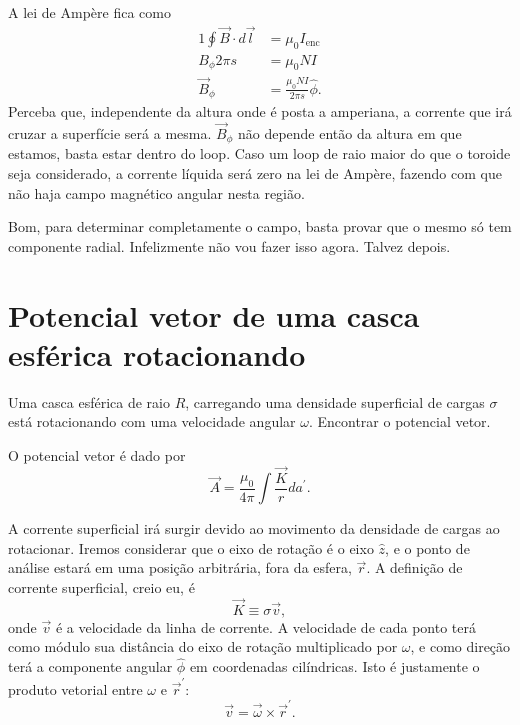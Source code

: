 \documentclass{article}
\newcommand{\rcaligrafico}{r}
\begin{document}
A lei de Ampère fica como
\begin{alignat}{1}
 \oint \vec{B} \cdot d\vec{l} &= \mu_0 I_{\mathrm{enc}}\\
 B_{\phi} 2\pi s &= \mu_0 N I\\
 \vec{B}_{\phi} &= \frac{\mu_0 N I}{2\pi s}\hat{\phi}.
\end{alignat}
Perceba que, independente da altura onde é posta a amperiana, a corrente que irá cruzar a superfície será a mesma. $\vec{B}_{\phi}$ não depende então da altura em que
estamos, basta estar dentro do loop. Caso um loop de raio maior do que o toroide seja considerado, a corrente líquida será zero na lei de Ampère, fazendo com que
não haja campo magnético angular nesta região.

Bom, para determinar completamente o campo, basta provar que o mesmo só tem componente radial. Infelizmente não vou fazer isso agora. Talvez depois.

\section{Potencial vetor de uma casca esférica rotacionando}
Uma casca esférica de raio $R$, carregando uma densidade superficial de cargas $\sigma$ está rotacionando com uma velocidade angular $\omega$.
Encontrar o potencial vetor.

O potencial vetor é dado por
\begin{equation}
 \vec{A} = \frac{\mu_0}{4 \pi} \int \frac{\vec{K}}{\rcaligrafico} da^{\prime}.
\end{equation}

A corrente superficial irá surgir devido ao movimento da densidade de cargas ao rotacionar. Iremos considerar que o eixo de rotação é o eixo $\hat{z}$, e o ponto
de análise estará em uma posição arbitrária, fora da esfera, $\vec{r}$. A definição de corrente superficial, creio eu, é
\begin{equation}
 \vec{K} \equiv \sigma \vec{v},
\end{equation}
onde $\vec{v}$ é a velocidade da linha de corrente. A velocidade de cada ponto terá como módulo sua distância do eixo de rotação multiplicado por $\omega$, e como direção
terá a componente angular $\hat{\phi}$ em coordenadas cilíndricas. Isto é justamente o produto vetorial entre $\omega$ e $\vec{r}^{\prime}$:
\begin{equation}
 \vec{v} = \vec{\omega} \times \vec{r}^{\prime}.
\end{equation}
\end{document}
